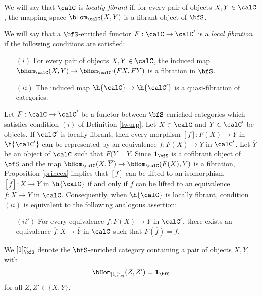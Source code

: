 \begin{Simplicial Categories}
\begin{definition}
We will say that $\calC$ is {\it locally fibrant} if, for every pair of objects
$X,Y \in \calC$, the mapping space $\bHom_{\calC}(X,Y)$ is a fibrant object
of $\bfS$.

We will say that a $\bfS$-enriched functor $F: \calC \rightarrow \calC'$ is a
{\it local fibration} if the following conditions are satisfied:
\begin{itemize}
\item[$(i)$] For every pair of objects
$X,Y \in \calC$, the induced map $\bHom_{\calC}(X,Y) \rightarrow
\bHom_{\calC'}(FX,FY)$ is a fibration in $\bfS$. 
\item[$(ii)$] The induced map $\h{\calC} \rightarrow \h{\calC'}$ is a quasi-fibration
of categories.
\end{itemize}
\end{definition}

\begin{remark}\label{dinty}
Let $F: \calC \rightarrow \calC'$ be a functor between $\bfS$-enriched categories
which satisfies condition $(i)$ of Definition \ref{twurp}. Let $X \in \calC$
and $Y \in \calC'$ be objects. If $\calC'$
is locally fibrant, then every morphism $[f]: F(X) \rightarrow Y$ in
$\h{\calC'}$ can be represented by an equivalence $f: F(X) \rightarrow Y$ in $\calC'$.
Let $\overline{Y}$ be an object of $\calC$ such that $F( \overline{Y} = Y$. Since
${\bf 1}_{\bfS}$ is a cofibrant object of $\bfS$ and the map
$\bHom_{\calC}( X, \overline{Y} ) \rightarrow \bHom_{\calC}( F(X), Y)$
is a fibration, Proposition \ref{princex} implies that $[f]$ can be lifted to
an isomorphism $[\overline{f}]: X \rightarrow \overline{Y}$ in $\h{\calC}$ if
and only if $f$ can be lifted to an equivalence $\overline{f}: X \rightarrow \overline{Y}$
in $\calC$. Consequently, when $\h{\calC}$ is locally fibrant,
condition $(ii)$ is equivalent to the following analogous assertion:
\begin{itemize}
\item[$(ii')$] For every equivalence $f: F(X) \rightarrow Y$ in $\calC'$, there
exists an equivalence $\overline{f}: X \rightarrow \overline{Y}$ in $\calC$
such that $F( \overline{f} ) = f$.
\end{itemize}
\end{remark}

\begin{notation}
We $[1]^{\sim}_{\bfS}$ denote the $\bfS$-enriched category
containing a pair of objects $X,Y$, with
$$ \bHom_{ [1]^{\sim}_{\bfS} }(Z, Z') = {\bf 1}_{\bfS}$$
for all $Z, Z' \in \{X, Y \}$. 
\end{notation}


\end{Simplicial Categories}
